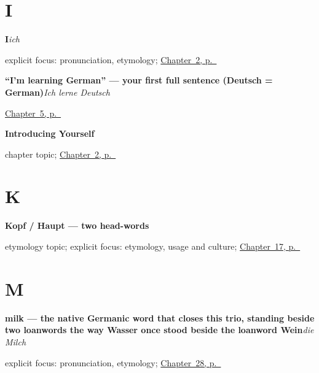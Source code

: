 \section*{I}

\noindent\begin{minipage}[t]{\linewidth}
\raggedright
\textbf{I}\enspace\emph{ich}\par
\footnotesize explicit focus: pronunciation, etymology; \hyperref[ch:introductions]{Chapter~2, p.~\pageref*{ch:introductions}}
\end{minipage}\par\smallskip

\noindent\begin{minipage}[t]{\linewidth}
\raggedright
\textbf{\textquotedblleft{}I'm learning German\textquotedblright{} — your first full sentence (Deutsch = German)}\enspace\emph{Ich lerne Deutsch}\par
\footnotesize \hyperref[ch:first-verbs]{Chapter~5, p.~\pageref*{ch:first-verbs}}
\end{minipage}\par\smallskip

\noindent\begin{minipage}[t]{\linewidth}
\raggedright
\textbf{Introducing Yourself}\par
\footnotesize chapter topic; \hyperref[ch:introductions]{Chapter~2, p.~\pageref*{ch:introductions}}
\end{minipage}\par\smallskip

\section*{K}

\noindent\begin{minipage}[t]{\linewidth}
\raggedright
\textbf{Kopf / Haupt — two head-words}\par
\footnotesize etymology topic; explicit focus: etymology, usage and culture; \hyperref[ch:ge-head-and-hand]{Chapter~17, p.~\pageref*{ch:ge-head-and-hand}}
\end{minipage}\par\smallskip

\section*{M}

\noindent\begin{minipage}[t]{\linewidth}
\raggedright
\textbf{milk — the native Germanic word that closes this trio, standing beside two loanwords the way Wasser once stood beside the loanword Wein}\enspace\emph{die Milch}\par
\footnotesize explicit focus: pronunciation, etymology; \hyperref[ch:ge-coffee-tea-milk]{Chapter~28, p.~\pageref*{ch:ge-coffee-tea-milk}}
\end{minipage}\par\smallskip

